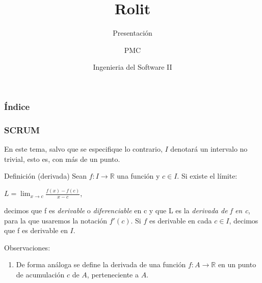 \documentclass{beamer}
\title{Rolit}
\author{PMC}
\date{Ingenieria del Software II}
\subtitle{Presentación}
\newcounter{saveenumi}
\newcommand{\seti}{\setcounter{saveenumi}{\value{enumi}}}
\begin{document}
\maketitle

\begin{frame}
\frametitle{Índice}
\tableofcontents[currentsection]
\end{frame}

\begin{frame}
\frametitle{SCRUM}
En este tema, salvo que se especifique lo contrario, $I$ denotará un intervalo no trivial, esto es, con más de un punto.

\begin{block}{Definición (derivada)}
Sean $f:I\rightarrow\mathbb{R}$ una función y $c\in{I}$. Si existe el límite:
\begin{center}
$L = \displaystyle\lim_{x \to c}\frac{f(x)-f(c)}{x-c}$,
\end{center}
decimos que f es \textit{derivable} o \textit{diferenciable} en c y que L es la \textit{derivada de f en c}, para la que usaremos la notación $f'(c)$.
Si $f$ es derivable en cada $c\in{I}$, decimos que f es derivable en $I$.
\end{block}
Observaciones:
\begin{enumerate}
\item De forma análoga se define la derivada de una función $f:A\rightarrow\mathbb{R}$ en un punto de acumulación $c$ de $A$, perteneciente a $A$.

\seti
\end{enumerate}

\end{frame}
\end{document}
